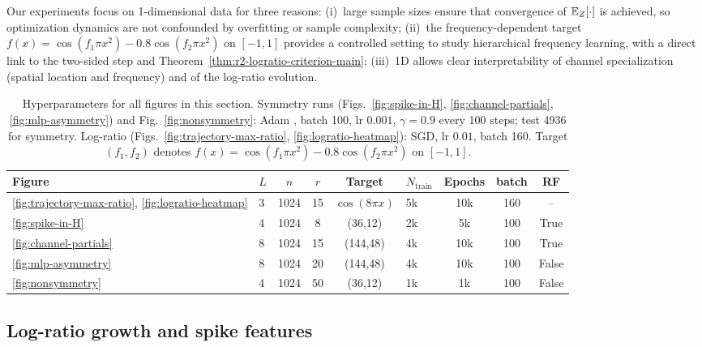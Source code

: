 \documentclass[nohyperref]{article}
\theoremstyle{plain}
\theoremstyle{definition}
\theoremstyle{remark}
\begin{document}
\label{sec:experiments}
\captionsetup{font=small}
Our experiments focus on 1-dimensional data for three reasons: (i)~large sample sizes ensure that convergence of $\mathbb{E}_Z[\cdot]$ is achieved, so optimization dynamics are not confounded by overfitting or sample complexity; (ii)~the frequency-dependent target $f(x)=\cos(f_1\pi x^2)-0.8\cos(f_2\pi x^2)$ on $[-1,1]$ provides a controlled setting to study hierarchical frequency learning, with a direct link to the two-sided step and Theorem~\ref{thm:r2-logratio-criterion-main}; (iii)~1D allows clear interpretability of channel specialization (spatial location and frequency) and of the log-ratio evolution.



\begin{table}[h!]
    \centering
    \caption{Hyperparameters for all figures in this section. Symmetry runs (Figs.~\ref{fig:spike-in-H}, \ref{fig:channel-partials}, \ref{fig:mlp-asymmetry}) and Fig.~\ref{fig:nonsymmetry}: Adam \cite{kingma2015adam}, batch 100, lr $0.001$, $\gamma{=}0.9$ every 100 steps; test 4936 for symmetry. Log-ratio (Figs.~\ref{fig:trajectory-max-ratio}, \ref{fig:logratio-heatmap}): SGD, lr $0.01$, batch 160. Target $(f_1,f_2)$ denotes $f(x)=\cos(f_1\pi x^2)-0.8\cos(f_2\pi x^2)$ on $[-1,1]$.}
    \label{tab:num-hparams}
    \small
    \setlength{\tabcolsep}{3pt}
    \begin{tabular}{@{}llccclccc@{}}
    \toprule
    Figure & $L$ & $n$ & $r$ & Target & $N_\textrm{train}$ & Epochs & batch & RF \\
    \midrule
    \ref{fig:trajectory-max-ratio}, \ref{fig:logratio-heatmap} & 3 & 1024 & 15 & $\cos(8\pi x)$ & 5k & 10k & 160 & -- \\
    \ref{fig:spike-in-H} & 4 & 1024 & 8 & (36,12) & 2k & 5k & 100 & True \\
    \ref{fig:channel-partials} & 8 & 1024 & 15 & (144,48) & 4k & 10k & 100 & True \\
    \ref{fig:mlp-asymmetry} & 8 & 1024 & 20 & (144,48) & 4k & 10k & 100 & False \\
    \ref{fig:nonsymmetry} & 4 & 1024 & 50 & (36,12) & 1k & 1k & 100 & False \\
    \bottomrule
    \end{tabular}
\end{table}


\subsection{Log-ratio growth and spike features}
\label{sec:meanfield-analysis}
\end{document}
